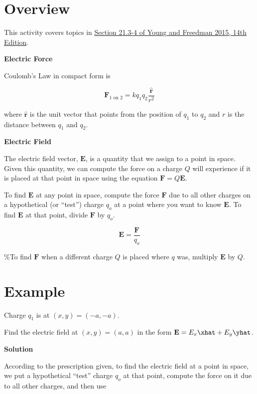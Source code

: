 \hypertarget{overview}{%
\section{Overview}\label{overview}}

This activity covers topics in
\href{https://drive.google.com/file/d/1JS_pBuNEwXdz9IzpSBFPJffgVacZmqN7/view?usp=sharing_remove_}{Section
21.3-4 of Young and Freedman 2015, 14th Edition}.

\textbf{Electric Force}

Coulomb's Law in compact form is

\[\mathbf{F}_{1\mbox{ on } 2}=kq_1q_2\frac{\hat{\mathbf{r}}}{r^2}\]

where \(\hat{\mathbf{r}}\) is the unit vector that points from the
position of \(q_1\) to \(q_2\) and \(r\) is the distance between \(q_1\)
and \(q_2\).

\textbf{Electric Field}

The electric field vector, \(\mathbf{E}\), is a quantity that we assign
to a point in space. Given this quantity, we can compute the force on a
charge \(Q\) will experience if it is placed at that point in space
using the equation \(\mathbf{F}=Q\mathbf{E}\).

To find \(\mathbf{E}\) at any point in space, compute the force
\(\mathbf{F}\) due to all other charges on a hypothetical (or ``test'')
charge \(q_o\) at a point where you want to know \(\mathbf{E}\). To find
\(\mathbf{E}\) at that point, divide \(\mathbf{F}\) by \(q_o\).

\[\mathbf{E} = \frac{\mathbf{F}}{q_o}\]

\%To find \(\mathbf{F}\) when a different charge \(Q\) is placed where
\(q\) was, multiply \(\mathbf{E}\) by \(Q\).

\hypertarget{example}{%
\section{Example}\label{example}}

Charge \(q_1\) is at \((x,y)=(-a,-a)\).

Find the electric field at \((x,y)=(a,a)\) in the form
\(\mathbf{E}=E_x\xhat + E_y\yhat\).

\textbf{Solution}

According to the prescription given, to find the electric field at a
point in space, we put a hypothetical ``test'' charge \(q_o\) at that
point, compute the force on it due to all other charges, and then use

